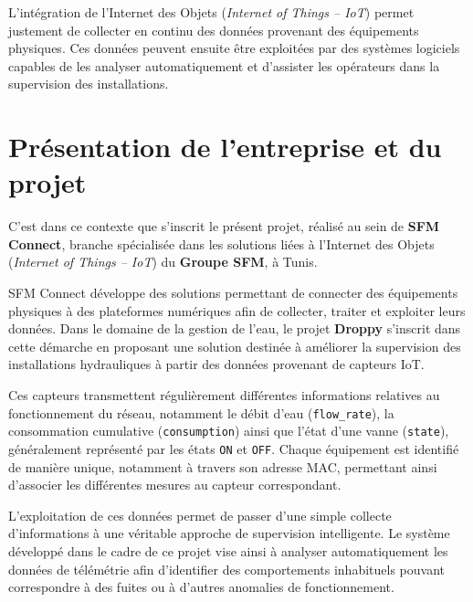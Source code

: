L'intégration de l'Internet des Objets
(\textit{Internet of Things -- IoT}) permet justement de collecter en continu
des données provenant des équipements physiques. Ces données peuvent ensuite
être exploitées par des systèmes logiciels capables de les analyser
automatiquement et d'assister les opérateurs dans la supervision des
installations.


\section{Présentation de l'entreprise et du projet}

C'est dans ce contexte que s'inscrit le présent projet, réalisé au sein de
\textbf{SFM Connect}, branche spécialisée dans les solutions liées à
l'Internet des Objets (\textit{Internet of Things -- IoT}) du
\textbf{Groupe SFM}, à Tunis.

SFM Connect développe des solutions permettant de connecter des équipements
physiques à des plateformes numériques afin de collecter, traiter et exploiter
leurs données. Dans le domaine de la gestion de l'eau, le projet
\textbf{Droppy} s'inscrit dans cette démarche en proposant une solution
destinée à améliorer la supervision des installations hydrauliques à partir
des données provenant de capteurs IoT.

Ces capteurs transmettent régulièrement différentes informations relatives au
fonctionnement du réseau, notamment le débit d'eau
(\texttt{flow\_rate}), la consommation cumulative
(\texttt{consumption}) ainsi que l'état d'une vanne
(\texttt{state}), généralement représenté par les états
\texttt{ON} et \texttt{OFF}. Chaque équipement est identifié de manière
unique, notamment à travers son adresse MAC, permettant ainsi d'associer les
différentes mesures au capteur correspondant.

L'exploitation de ces données permet de passer d'une simple collecte
d'informations à une véritable approche de supervision intelligente. Le
système développé dans le cadre de ce projet vise ainsi à analyser
automatiquement les données de télémétrie afin d'identifier des comportements
inhabituels pouvant correspondre à des fuites ou à d'autres anomalies de
fonctionnement.


